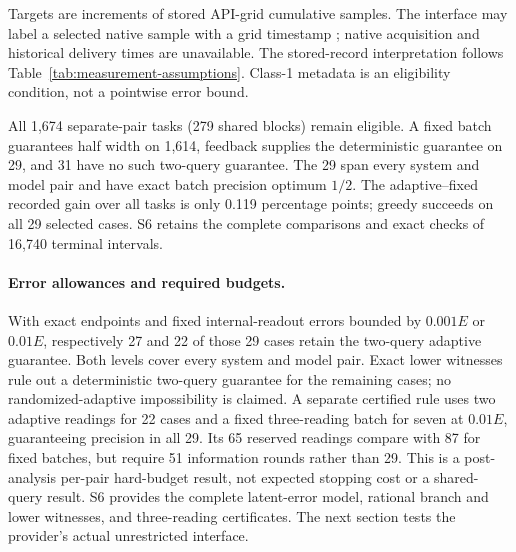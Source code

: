 Targets are increments of stored API-grid cumulative samples. The interface
may label a selected native sample with a grid timestamp \citep{hpmcode};
native acquisition and historical delivery times are unavailable. The
stored-record interpretation follows Table~\ref{tab:measurement-assumptions}.
Class-1 metadata is an eligibility condition, not a pointwise error bound.

All 1,674 separate-pair tasks (279 shared blocks) remain eligible. A fixed
batch guarantees half width on 1,614, feedback supplies the deterministic
guarantee on 29, and 31 have no such two-query guarantee. The 29 span every
system and model pair and have exact batch precision optimum $1/2$.
The adaptive--fixed recorded gain over all tasks is only 0.119 percentage
points; greedy succeeds on all 29 selected cases. S6 retains the complete
comparisons and exact checks of 16,740 terminal intervals.

\paragraph{Error allowances and required budgets.}
\label{sec:stored-error-sensitivity}
With exact endpoints and fixed internal-readout errors bounded by
$0.001E$ or $0.01E$, respectively 27 and 22 of those 29 cases retain the
two-query adaptive guarantee. Both levels cover every system and model
pair. Exact lower witnesses rule out a deterministic two-query guarantee
for the remaining cases; no randomized-adaptive impossibility is claimed.
A separate certified rule uses two adaptive readings for 22 cases and a
fixed three-reading batch for seven at $0.01E$, guaranteeing precision in
all 29. Its 65 reserved readings compare with 87 for fixed batches, but
require 51 information rounds rather than 29. This is a post-analysis
per-pair hard-budget result, not expected stopping cost or a shared-query
result. S6 provides the complete latent-error model, rational branch and
lower witnesses, and three-reading certificates. The next section tests
the provider's actual unrestricted interface.

